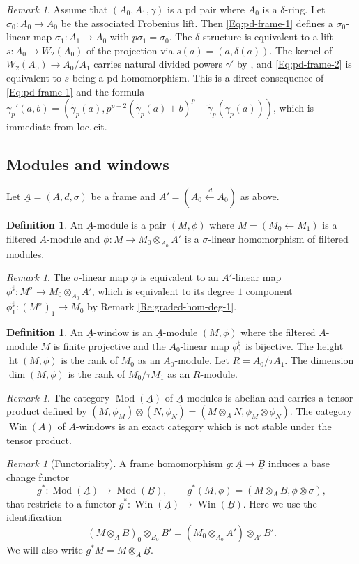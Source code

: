 \documentclass[a4paper,11pt]{amsart}
\theoremstyle{plain}
\theoremstyle{definition}
\newtheorem{Defn}[equation]{Definition}
\theoremstyle{remark}
\newtheorem{Remark}[equation]{Remark}
\newcommand{\bDe}{\begin{Defn}}
\newcommand{\eDe}{\end{Defn}}
\newcommand{\bRe}{\begin{Remark}}
\newcommand{\eRe}{\end{Remark}}
\renewcommand{\u}{\underline}
\newcommand{\uM}{M} %
\numberwithin{equation}{section}
\DeclareMathOperator{\height}{ht}
\DeclareMathOperator{\Mod}{Mod}
\DeclareMathOperator{\Win}{Win}
\begin{document}
\bRe
\label{Re:pd-frame}
Assume that $(A_0,A_1,\gamma)$ is a pd pair where $A_0$ is a $\delta$-ring. Let $\sigma_0\colon A_0\to A_0$ be the associated Frobenius lift. Then \eqref{Eq:pd-frame-1} defines a $\sigma_0$-linear map $\sigma_1\colon A_1\to A_0$ with $p\sigma_1=\sigma_0$. The $\delta$-structure is equivalent to a lift $s\colon A_0\to W_2(A_0)$ of the projection via $s(a)=(a,\delta(a))$. The kernel of $W_2(A_0)\to A_0/A_1$ carries natural divided powers $\gamma'$ by \cite[2.3]{Zink:The-display}, and \eqref{Eq:pd-frame-2} is equivalent to $s$ being a pd homomorphism. This is a direct consequence of \eqref{Eq:pd-frame-1} and the formula $\tilde\gamma_p'(a,b)=(\tilde\gamma_p(a),p^{p-2}(\tilde\gamma_p(a)+b)^p-\tilde\gamma_p(\tilde\gamma_p(a)))$,  which is immediate from loc.\,cit.
\eRe

\subsection{Modules and windows}

Let $\u A=(A,d,\sigma)$ be a frame and $A'=(A_0\xleftarrow {\:d} A_0)$
as above.

\bDe
\label{De:uA-mod}
An $\u A$-module is a pair $(M,\phi)$ where $M=(M_0\leftarrow M_1)$ is a filtered $A$-module and $\phi\colon M\to M_0\otimes_{A_0}A'$ is a $\sigma$-linear homomorphism of filtered modules.
\eDe

\bRe
The $\sigma$-linear map $\phi$ is equivalent to an $A'$-linear map $\phi^\sharp\colon M^\sigma\to M_0\otimes_{A_0}A'$, which is equivalent to its degree $1$ component $\phi^\sharp_1\colon(M^\sigma)_1\to M_0$ by Remark \ref{Re:graded-hom-deg-1}.
\eRe

\bDe
\label{De:window}
An $\u A$-window is an $\u A$-module $(M,\phi)$ where the filtered $A$-module $M$ is finite projective and the $A_0$-linear map $\phi^\sharp_1$ is bijective. The height $\height(M,\phi)$ is the rank of $M_0$ as an $A_0$-module. Let $R=A_0/\tau A_1$. The dimension $\dim(M,\phi)$ is the rank of $M_0/\tau M_1$ as an $R$-module.
\eDe

\bRe
\label{Re:tensor-Mod-frame}
The category $\Mod(\u A)$ of $\u A$-modules is abelian and carries a tensor product defined by $(M,\phi_M)\otimes(N,\phi_N)=(M\otimes_AN,\phi_M\otimes\phi_N)$. The category $\Win(\u A)$ of $\u A$-windows is an exact category which is not stable under the tensor product. 
\eRe

\bRe[Functoriality]
A frame homomorphism $g\colon \u A\to\u B$ induces a base change functor
\[
g^*\colon \Mod(\u A)\to\Mod(\u B),
\qquad
g^*(M,\phi)=(M\otimes_AB,\phi\otimes \sigma),
\]
that restricts to a functor $g^*\colon \Win(\u A)\to\Win(\u B)$.
Here we use the identification 
\[
(M\otimes_AB)_0\otimes_{B_0}B'=(M_0\otimes_{A_0}A')\otimes_{A'}B'.
\]
We will also write $g^*\uM=\uM\otimes_{\u A}\u B$. 
\eRe
\end{document}
